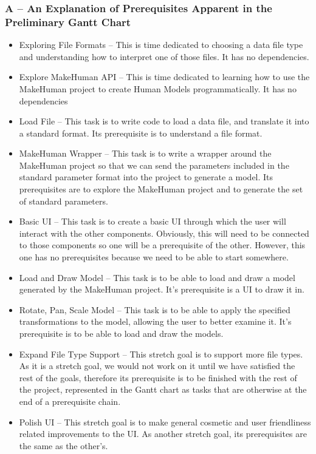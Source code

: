 \documentclass[letterpaper,10pt, onecolumn, draftclsnofoot]{IEEEtran}
\begin{document}
\subsubsection{A -- An Explanation of Prerequisites Apparent in the Preliminary Gantt Chart}
\begin{itemize}
	\item Exploring File Formats -- This is time dedicated to choosing a data file type and understanding how to interpret one of those files. It has no dependencies.
	\item Explore MakeHuman API -- This is time dedicated to learning how to use the MakeHuman project to create Human Models programmatically. It has no dependencies
	\item Load File -- This task is to write code to load a data file, and translate it into a standard format. Its prerequisite is to understand a file format.
	\item MakeHuman Wrapper -- This task is to write a wrapper around the MakeHuman project so that we can send the parameters included in the standard parameter format into the project to generate a model. Its prerequisites are to explore the MakeHuman project and to generate the set of standard parameters.
	\item Basic UI -- This task is to create a basic UI through which the user will interact with the other components. Obviously, this will need to be connected to those components so one will be a prerequisite of the other. However, this one has no prerequisites because we need to be able to start somewhere.
	\item Load and Draw Model -- This task is to be able to load and draw a model generated by the MakeHuman project. It's prerequisite is a UI to draw it in.
	\item Rotate, Pan, Scale Model -- This task is to be able to apply the specified transformations to the model, allowing the user to better examine it. It's prerequisite is to be able to load and draw the models.
	\item Expand File Type Support -- This stretch goal is to support more file types. As it is a stretch goal, we would not work on it until we have satisfied the rest of the goals, therefore its prerequisite is to be finished with the rest of the project, represented in the Gantt chart as tasks that are otherwise at the end of a prerequisite chain.
	\item Polish UI -- This stretch goal is to make general cosmetic and user friendliness related improvements to the UI. As another stretch goal, its prerequisites are the same as the other's.
\end{itemize}
\end{document}
